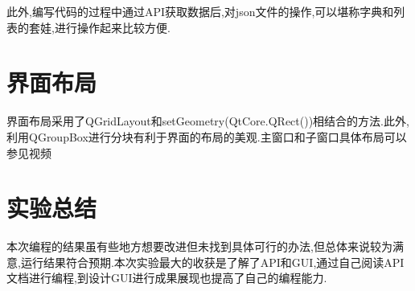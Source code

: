 \documentclass[12pt,a4paper,UTF8]{ctexart}
\begin{document}
此外,编写代码的过程中通过API获取数据后,对json文件的操作,可以堪称字典和列表的套娃,进行操作起来比较方便.
    \section{界面布局}
    界面布局采用了QGridLayout和setGeometry(QtCore.QRect())相结合的方法.此外,利用QGroupBox进行分块有利于界面的布局的美观.主窗口和子窗口具体布局可以参见视频
    \section{实验总结}
本次编程的结果虽有些地方想要改进但未找到具体可行的办法,但总体来说较为满意,运行结果符合预期.本次实验最大的收获是了解了API和GUI,通过自己阅读API文档进行编程,到设计GUI进行成果展现也提高了自己的编程能力.
\end{document}
